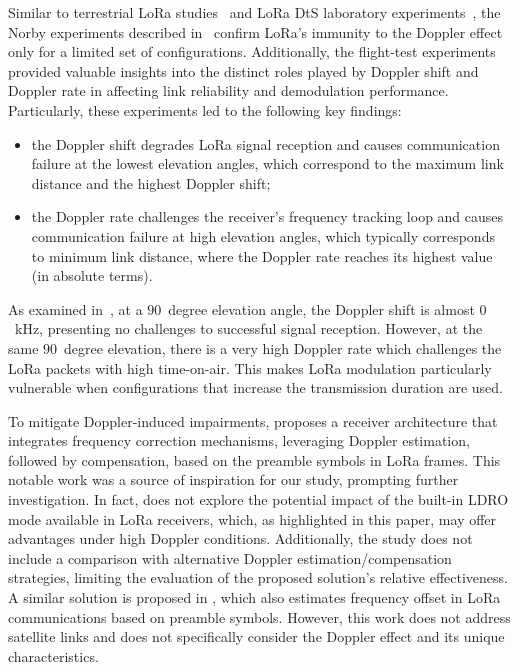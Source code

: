 \documentclass{IEEEtran}
\begin{document}
Similar to terrestrial \ac{LoRa} studies~\cite{kmdoppler,V2X} and \ac{LoRa} \ac{DtS} laboratory experiments~\cite{Doroshkin.2019,LoRaDoppler1}, the Norby experiments described in~\cite{Norby} confirm \ac{LoRa}'s immunity to the Doppler effect only for a limited set of configurations. Additionally, the flight-test experiments provided valuable insights into the distinct roles played by Doppler shift and Doppler rate in affecting link reliability and demodulation performance. Particularly, these experiments led to the following key findings: 
\begin{itemize}
		\item the Doppler shift degrades \ac{LoRa} signal reception and causes communication failure at the lowest elevation angles, which correspond to the maximum link distance and the highest Doppler shift;
		\item the Doppler rate challenges the receiver’s frequency tracking loop and causes communication failure  at high elevation angles, which typically corresponds to minimum link distance, where the Doppler rate reaches its highest value (in absolute terms).
\end{itemize}

As examined in~\cite{Ullah.2024,Norby}, at a $90$~degree elevation angle, the Doppler shift is almost $0$~kHz, presenting no challenges to successful signal reception. However, at the same $90$~degree elevation, there is a very high Doppler rate which challenges the \ac{LoRa} packets with high time-on-air. This makes \ac{LoRa} modulation particularly vulnerable when configurations that increase the transmission duration are used.

To mitigate Doppler-induced impairments, \cite{Colavolpe.2019} proposes a receiver architecture that integrates frequency correction mechanisms, leveraging Doppler estimation, followed by compensation, based on the preamble symbols in \ac{LoRa} frames. This notable work was a source of inspiration for our study, prompting further investigation. In fact, \cite{Colavolpe.2019} does not explore the potential impact of the built-in \ac{LDRO} mode available in \ac{LoRa} receivers, which, as highlighted in this paper, may offer advantages under high Doppler conditions. Additionally, the study does not include a comparison with alternative Doppler estimation/compensation strategies, limiting the evaluation of the proposed solution's relative effectiveness. A similar solution is proposed in \cite{sym14040747}, which also estimates frequency offset in \ac{LoRa} communications based on preamble symbols. However, this work does not address satellite links and does not specifically consider the Doppler effect and its unique characteristics. 
\end{document}
